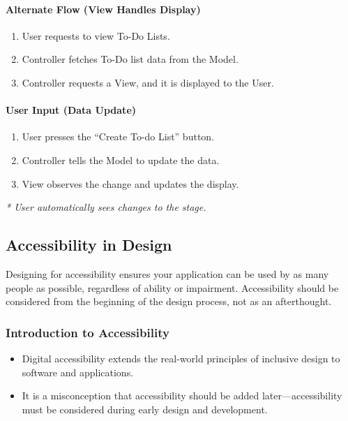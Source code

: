 \documentclass{article}
\begin{document}
\paragraph{Alternate Flow (View Handles Display)}
\begin{enumerate}
    \item User requests to view To-Do Lists.
    \item Controller fetches To-Do list data from the Model.
    \item Controller requests a View, and it is displayed to the User.
\end{enumerate}

\paragraph{User Input (Data Update)}
\begin{enumerate}
    \item User presses the “Create To-do List” button.
    \item Controller tells the Model to update the data.
    \item View observes the change and updates the display.
\end{enumerate}

\textit{* User automatically sees changes to the stage.}


\subsection{Accessibility in Design}

Designing for accessibility ensures your application can be used by as many people as possible, regardless of ability or impairment. Accessibility should be considered from the beginning of the design process, not as an afterthought.

\subsubsection{Introduction to Accessibility}
\begin{itemize}
  \item Digital accessibility extends the real-world principles of inclusive design to software and applications.
  \item It is a misconception that accessibility should be added later—accessibility must be considered during early design and development.
\end{itemize}
\end{document}
